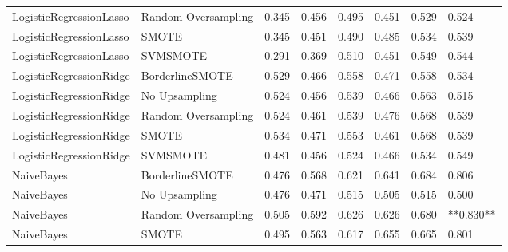 \begin{tabular}{llllllll}
     LogisticRegressionLasso & Random Oversampling & 0.345 &                     0.456 &                 0.495 &                  0.451 &                                   0.529 &     0.524 \\
     LogisticRegressionLasso &               SMOTE & 0.345 &                     0.451 &                 0.490 &                  0.485 &                                   0.534 &     0.539 \\
     LogisticRegressionLasso &            SVMSMOTE & 0.291 &                     0.369 &                 0.510 &                  0.451 &                                   0.549 &     0.544 \\
     LogisticRegressionRidge &     BorderlineSMOTE & 0.529 &                     0.466 &                 0.558 &                  0.471 &                                   0.558 &     0.534 \\
     LogisticRegressionRidge &       No Upsampling & 0.524 &                     0.456 &                 0.539 &                  0.466 &                                   0.563 &     0.515 \\
     LogisticRegressionRidge & Random Oversampling & 0.524 &                     0.461 &                 0.539 &                  0.476 &                                   0.568 &     0.539 \\
     LogisticRegressionRidge &               SMOTE & 0.534 &                     0.471 &                 0.553 &                  0.461 &                                   0.568 &     0.539 \\
     LogisticRegressionRidge &            SVMSMOTE & 0.481 &                     0.456 &                 0.524 &                  0.466 &                                   0.534 &     0.549 \\
                  NaiveBayes &     BorderlineSMOTE & 0.476 &                     0.568 &                 0.621 &                  0.641 &                                   0.684 &     0.806 \\
                  NaiveBayes &       No Upsampling & 0.476 &                     0.471 &                 0.515 &                  0.505 &                                   0.515 &     0.500 \\
                  NaiveBayes & Random Oversampling & 0.505 &                     0.592 &                 0.626 &                  0.626 &                                   0.680 & **0.830** \\
                  NaiveBayes &               SMOTE & 0.495 &                     0.563 &                 0.617 &                  0.655 &                                   0.665 &     0.801 \\

\end{tabular}
